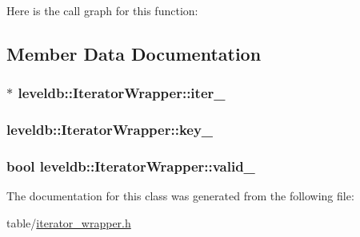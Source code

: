 Here is the call graph for this function\-:




\subsection{Member Data Documentation}
\hypertarget{classleveldb_1_1_iterator_wrapper_a167c198349e18c74de31f3b5041ab5eb}{
\subsubsection[{iter\-\_\-}]{$\ast$ leveldb\-::\-Iterator\-Wrapper\-::iter\-\_\-\hspace{0.3cm}{\ttfamily [private]}}}\label{classleveldb_1_1_iterator_wrapper_a167c198349e18c74de31f3b5041ab5eb}
\hypertarget{classleveldb_1_1_iterator_wrapper_a2f21505d8ed93356a2290526d8894850}{
\subsubsection[{key\-\_\-}]{ leveldb\-::\-Iterator\-Wrapper\-::key\-\_\-\hspace{0.3cm}{\ttfamily [private]}}}\label{classleveldb_1_1_iterator_wrapper_a2f21505d8ed93356a2290526d8894850}
\hypertarget{classleveldb_1_1_iterator_wrapper_ab55d69f29a486d72c29319245cece3e9}{
\subsubsection[{valid\-\_\-}]{\setlength{\rightskip}{0pt plus 5cm}bool leveldb\-::\-Iterator\-Wrapper\-::valid\-\_\-\hspace{0.3cm}{\ttfamily [private]}}}\label{classleveldb_1_1_iterator_wrapper_ab55d69f29a486d72c29319245cece3e9}


The documentation for this class was generated from the following file\-:\begin{DoxyCompactItemize}
\item 
table/\hyperlink{iterator__wrapper_8h}{iterator\-\_\-wrapper.\-h}\end{DoxyCompactItemize}
